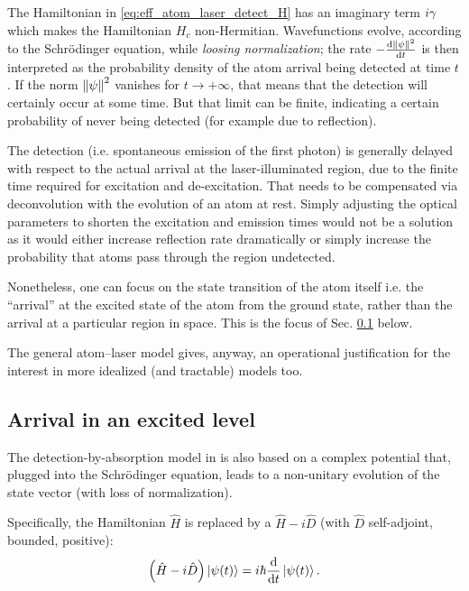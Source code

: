 The Hamiltonian in \eqref{eq:eff_atom_laser_detect_H} has an imaginary term $i\gamma$
which makes the Hamiltonian $H_c$ non-Hermitian. Wavefunctions
evolve, according to the Schr\"odinger equation, while \emph{loosing normalization};
the rate $-\dv{\norm{\psi}^2}{t}$ is then interpreted as the probability density
of the atom arrival being detected at time $t$. If the norm $\norm{\psi}^2$ vanishes for $t\rightarrow+\infty$,
that means that the detection will certainly occur at some time.
But that limit can be finite, indicating a certain probability of never being detected
(for example due to reflection).

The detection (i.e. spontaneous emission of the first photon) is generally delayed
with respect to the actual arrival at the laser-illuminated region, due to the finite time
required for excitation and de-excitation. That needs to be compensated via deconvolution
with the evolution of an atom at rest. Simply adjusting the optical parameters
to shorten the excitation and emission times
would not be a solution as it would either increase reflection rate dramatically
or simply increase the probability that atoms pass through the region undetected. 

Nonetheless, one can focus on the state transition of the atom itself i.e.
the ``arrival'' at the excited state of the atom from the ground state,
rather than the arrival at a particular region in space. This is the
focus of Sec. \ref{sec:hist:detect:kiukas} below.

The general atom--laser
model gives, anyway, an operational justification for the interest
in more idealized (and tractable) models too.

\subsection{Arrival in an excited level}\label{sec:hist:detect:kiukas}

The detection-by-absorption model in \cite{RuschhauptAbsorption}
is also based on a complex potential that, plugged into the Schr\"odinger equation,
leads to a non-unitary evolution of the state vector
(with loss of normalization).

Specifically, the Hamiltonian $\hat{H}$ is replaced by a $\hat{H} - i\hat{D}$
(with $\hat{D}$ self-adjoint, bounded, positive):
\begin{equation}\label{eq:schrod_complex_pot}
  \qty(\hat{H}  - i\hat{D})\ket{\psi(t)} = i\hbar\dv{t}\ket{\psi(t)}  \text{.}
\end{equation}

